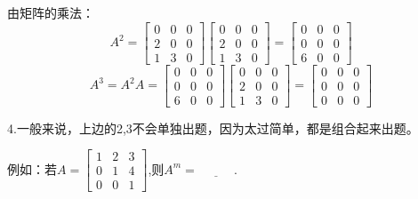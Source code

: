 \documentclass{article}
\begin{document}
\begin{jie}
由矩阵的乘法：
\begin{equation*}
 A^{2}= \begin{bmatrix}
   0&0&0\\
   2&0&0\\
   1&3&0
  \end{bmatrix}  \begin{bmatrix}
   0&0&0\\
   2&0&0\\
   1&3&0
  \end{bmatrix}=
    \begin{bmatrix}
   0&0&0\\
   0&0&0\\
   6&0&0
  \end{bmatrix}
\end{equation*}
\begin{equation*}
 A^{3}=A^{2}A=    \begin{bmatrix}
   0&0&0\\
   0&0&0\\
   6&0&0
  \end{bmatrix}  \begin{bmatrix}
   0&0&0\\
   2&0&0\\
   1&3&0
  \end{bmatrix}=
    \begin{bmatrix}
   0&0&0\\
   0&0&0\\
   0&0&0
  \end{bmatrix}
\end{equation*}
\end{jie}

4.一般来说，上边的2,3不会单独出题，因为太过简单，都是组合起来出题。


例如：若$
  A=
  \begin{bmatrix}
   1 & 2 & 3\\
   0& 1&4\\
   0& 0&1
  \end{bmatrix}
  $,则$A^{m}=\underline{~~~~~~~~~~~~~}.$
\end{document}
